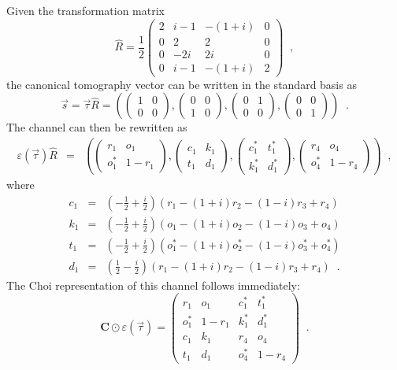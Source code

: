 Given the transformation matrix
$$
\hat{R} = \frac{1}{2}\begin{pmatrix}
2&i-1&-(1+i)&0\\
0&2&2&0\\
0&-2i&2i&0\\
0&i-1&-(1+i)&2
\end{pmatrix}\;\;,
$$
the canonical tomography vector can be written in the standard basis as
$$
\vec{s}=\vec{\tau}\hat{R}=\left(\begin{pmatrix}
1&0\\
0&0
\end{pmatrix},\begin{pmatrix}
0&0\\
1&0
\end{pmatrix},\begin{pmatrix}
0&1\\
0&0
\end{pmatrix},
\begin{pmatrix}
0&0\\
0&1
\end{pmatrix}\right)\;\;.
$$
The channel can then be rewritten as
\begin{eqnarray*}
\varepsilon\left(\vec{\tau}\right)\hat{R} &=& 
\left(\begin{pmatrix}
r_1&o_1\\
o^*_1&1-r_1
\end{pmatrix},\begin{pmatrix}
c_1&k_1\\
t_1&d_1
\end{pmatrix},\begin{pmatrix}
c_1^*&t_1^*\\
k_1^*&d_1^*
\end{pmatrix},\begin{pmatrix}
r_4&o_4\\
o^*_4&1-r_4
\end{pmatrix}\right)\;\;,
\end{eqnarray*}
where 
\begin{eqnarray*}
c_1 &=& \left(-\frac{1}{2}+\frac{i}{2}\right) (r_1-(1+i) r_2-(1-i) r_3+r_4)\\
k_1 &=& \left(-\frac{1}{2}+\frac{i}{2}\right) (o_1-(1+i) o_2-(1-i) o_3+o_4)\\
t_1 &=& \left(-\frac{1}{2}+\frac{i}{2}\right) (o_1^*-(1+i) o_2^*-(1-i) o_3^*+o_4^*)\\
d_1 &=& \left(\frac{1}{2}-\frac{i}{2}\right) (r_1-(1+i) r_2-(1-i) r_3+r_4)\;\;.
\end{eqnarray*}
The Choi representation of this channel follows immediately:
$$
\mathbf{C}\odot\varepsilon(\vec{\tau}) = \begin{pmatrix}
r_1&o_1&c_1^*&t_1^*\\
o_1^*&1-r_1&k_1^*&d_1^*\\
c_1&k_1&r_4&o_4\\
t_1&d_1&o_4^*&1-r_4
\end{pmatrix}\;\;.
$$


